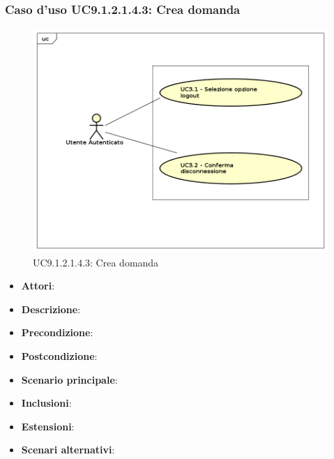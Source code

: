 						\subsubsection{Caso d'uso UC9.1.2.1.4.3: Crea domanda}
						\label{UC9.1.2.1.4.3}
						\begin{figure}[h]
							\centering
						\includegraphics[scale=0.7,keepaspectratio]{UML/UC9.png}
							\caption{UC9.1.2.1.4.3: Crea domanda}
						\end{figure}
						\FloatBarrier
						\begin{itemize}
							\item \textbf{Attori}: 
							\item \textbf{Descrizione}: 
							\item \textbf{Precondizione}: 
							\item \textbf{Postcondizione}: 
							\item \textbf{Scenario principale}:
							\item \textbf{Inclusioni}:
							\item \textbf{Estensioni}:
							\item \textbf{Scenari alternativi}:
						\end{itemize}
						
